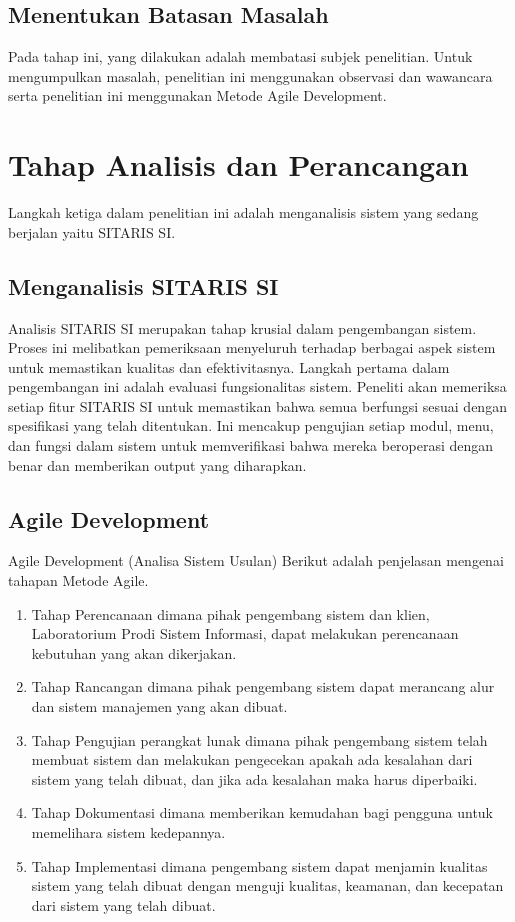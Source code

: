 \subsection{Menentukan Batasan Masalah}
Pada tahap ini, yang dilakukan adalah membatasi subjek penelitian. Untuk mengumpulkan masalah, penelitian ini menggunakan observasi dan wawancara serta penelitian ini menggunakan Metode Agile Development.

\section{Tahap Analisis dan Perancangan}
Langkah ketiga dalam penelitian ini adalah menganalisis sistem yang sedang berjalan yaitu SITARIS SI.

\subsection{Menganalisis SITARIS SI}
Analisis SITARIS SI merupakan tahap krusial dalam pengembangan sistem. Proses ini melibatkan pemeriksaan menyeluruh terhadap berbagai aspek sistem untuk memastikan kualitas dan efektivitasnya. Langkah pertama dalam pengembangan ini adalah evaluasi fungsionalitas sistem. Peneliti akan memeriksa setiap fitur SITARIS SI untuk memastikan bahwa semua berfungsi sesuai dengan spesifikasi yang telah ditentukan. Ini mencakup pengujian setiap modul, menu, dan fungsi dalam sistem untuk memverifikasi bahwa mereka beroperasi dengan benar dan memberikan output yang diharapkan.

\subsection{Agile Development}
Agile Development (Analisa Sistem Usulan) Berikut adalah penjelasan mengenai tahapan Metode Agile.
\begin{enumerate}
	\item Tahap Perencanaan dimana pihak pengembang sistem dan klien, Laboratorium Prodi Sistem Informasi, dapat melakukan perencanaan kebutuhan yang akan dikerjakan.
	\item Tahap Rancangan dimana pihak pengembang sistem dapat merancang alur dan sistem manajemen yang akan dibuat.
	\item Tahap Pengujian perangkat lunak dimana pihak pengembang sistem telah membuat sistem dan melakukan pengecekan apakah ada kesalahan dari sistem yang telah dibuat, dan jika ada kesalahan maka harus diperbaiki.
	\item Tahap Dokumentasi dimana memberikan kemudahan bagi pengguna untuk memelihara sistem kedepannya.
	\item Tahap Implementasi dimana pengembang sistem dapat menjamin kualitas sistem yang telah dibuat dengan menguji kualitas, keamanan, dan kecepatan dari sistem yang telah dibuat.
\end{enumerate}

